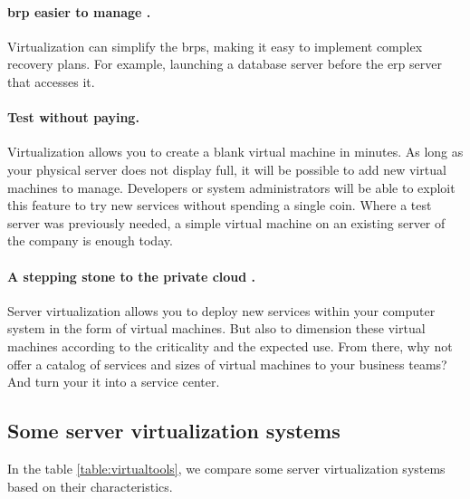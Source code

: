 \paragraph{\gls{brp} easier to manage \citep{vttools}.} Virtualization can simplify the \glspl{brp}, making it easy to implement complex recovery plans. For example, launching a database server before the \acrshort{erp} server that accesses it. 


\paragraph{Test without paying.} Virtualization allows you to create a blank virtual machine in minutes. As long as your physical server does not display full, it will be possible to add new virtual machines to manage. Developers or system administrators will be able to exploit this feature to try new services without spending a single coin. Where a test server was previously needed, a simple virtual machine on an existing server of the company is enough today.

\paragraph{A stepping stone to the private cloud \citep{vttools}.} Server virtualization allows you to deploy new services within your computer system in the form of virtual machines. But also to dimension these virtual machines according to the criticality and the expected use. From there, why not offer a catalog of services and sizes of virtual machines to your business teams? And turn your \acrshort{it} into a service center. 

\subsection{Some server virtualization systems}

In the table \ref{table:virtualtools}, we compare some server virtualization systems based on their characteristics. 

